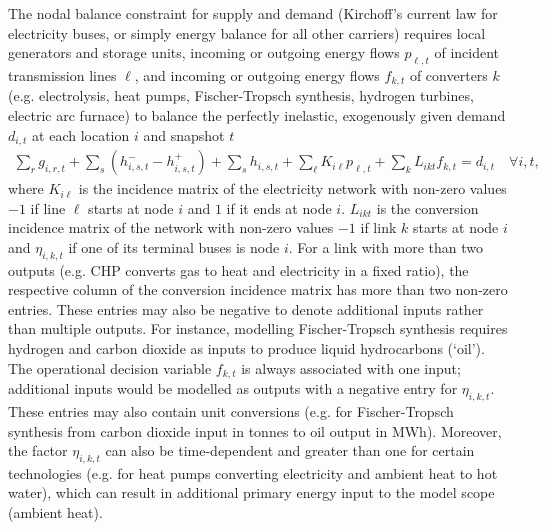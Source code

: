 The nodal balance constraint for supply and demand (Kirchoff's current law for
electricity buses, or simply energy balance for all other carriers) requires
local generators and storage units, incoming or outgoing energy flows
$p_{\ell,t}$ of incident transmission lines $\ell$, and incoming or outgoing
energy flows $f_{k,t}$ of converters $k$ (e.g. electrolysis, heat pumps,
Fischer-Tropsch synthesis, hydrogen turbines, electric arc furnace) to balance the
perfectly inelastic, exogenously given demand $d_{i,t}$ at each location $i$ and
snapshot $t$
\begin{align}
    \sum_r g_{i,r,t} + \sum_s \left(h_{i,s,t}^- - h_{i,s,t}^+ \right) + \sum_s h_{i,s,t} + \sum_\ell K_{i\ell} p_{\ell,t} + \sum_k L_{ikt} f_{k,t} = d_{i,t}\quad \forall i,t, \label{eq:balance}
\end{align}
where $K_{i\ell}$ is the incidence matrix of the electricity network with
non-zero values $-1$ if line $\ell$ starts at node $i$ and $1$ if it ends at
node $i$. $L_{ikt}$ is the conversion incidence matrix of the network with non-zero
values $-1$ if link $k$ starts at node $i$ and $\eta_{i,k,t}$ if one of its
terminal buses is node $i$. For a link with more than two outputs (e.g. CHP
converts gas to heat and electricity in a fixed ratio), the respective column of
the conversion incidence matrix has more than two non-zero entries. These entries may
also be negative to denote additional inputs rather than multiple outputs. For
instance, modelling Fischer-Tropsch synthesis requires hydrogen and carbon
dioxide as inputs to produce liquid hydrocarbons (`oil'). The operational
decision variable $f_{k,t}$ is always associated with one input; additional
inputs would be modelled as outputs with a negative entry for $\eta_{i,k,t}$.
These entries may also contain unit conversions (e.g. for Fischer-Tropsch
synthesis from carbon dioxide input in tonnes to oil output in MWh). Moreover,
the factor $\eta_{i,k,t}$ can also be time-dependent and greater than one for
certain technologies (e.g. for heat pumps converting electricity and ambient
heat to hot water), which can result in additional primary energy input to the
model scope (ambient heat).

